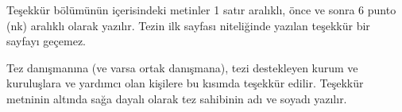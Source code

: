 \begin{tesekkur}
Teşekkür bölümünün içerisindeki metinler 1 satır aralıklı, önce ve sonra 6 punto (nk) aralıklı olarak yazılır. Tezin ilk sayfası niteliğinde yazılan teşekkür bir sayfayı geçemez.

Tez danışmanına (ve varsa ortak danışmana), tezi destekleyen kurum ve kuruluşlara ve yardımcı olan kişilere bu kısımda teşekkür edilir. Teşekkür metninin altında sağa dayalı olarak tez sahibinin adı ve soyadı yazılır.
\end{tesekkur}
